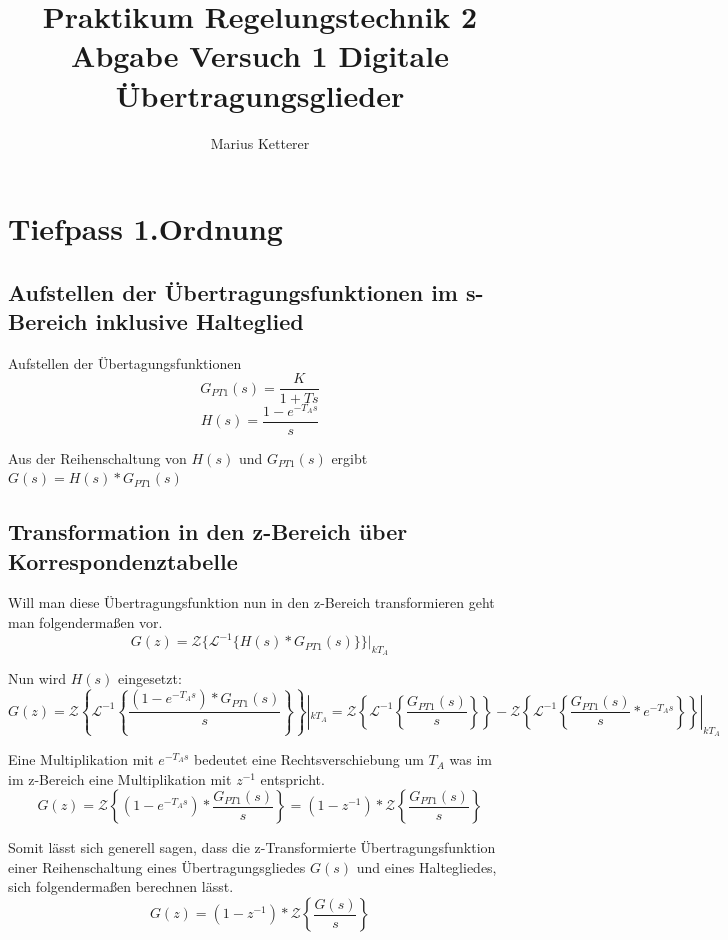 \documentclass[12pt,a4paper]{report}
\author{Marius Ketterer}
\title{Praktikum Regelungstechnik 2 Abgabe Versuch 1 Digitale Übertragungsglieder}
\begin{document}
\maketitle
\tableofcontents

\chapter{Tiefpass 1.Ordnung}
\section{Aufstellen der Übertragungsfunktionen im s-Bereich inklusive Halteglied}
Aufstellen der Übertagungsfunktionen
\begin{equation}
G_{PT1}(s) = \frac{K}{1+Ts} 
\end{equation}
\begin{equation}
H(s) = \frac{1-e^{-T_As}}{s}
\end{equation}

Aus der Reihenschaltung von $H(s)$ und $G_{PT1}(s)$ ergibt $G(s) = H(s)*G_{PT1}(s)$\\
\section{Transformation in den z-Bereich über Korrespondenztabelle}
Will man diese Übertragungsfunktion nun in den z-Bereich transformieren geht man folgendermaßen vor.
\begin{equation}
G(z) = \mathcal{Z}\{\mathcal{L}^{-1}\{H(s)*G_{PT1}(s)\}\}|_{kT_A}
\end{equation}

Nun wird $H(s)$ eingesetzt:
\begin{equation}
G(z)=
\mathcal{Z}\left\{\mathcal{L}^{-1}\left\{\frac{(1-e^{-T_As})* G_{PT1}(s)}{s}\right\}\right\}|_{kT_A}
= \mathcal{Z}\left\{\mathcal{L}^{-1}\left\{\frac{G_{PT1}(s)}{s}\right\}\right\}
-\mathcal{Z}\left\{\mathcal{L}^{-1}\left\{\frac{G_{PT1}(s)}{s}*e^{-T_As}\right\}\right\}|_{kT_A}
\end{equation}

Eine Multiplikation mit $e^{-T_As}$ bedeutet eine Rechtsverschiebung um $T_A$ was im im z-Bereich eine Multiplikation mit $z^{-1}$ entspricht.
\begin{equation}
G(z) = \mathcal{Z}\left\{(1-e^{-T_As})*\frac{G_{PT1}(s)}{s}\right\} = (1-z^{-1})*\mathcal{Z}\left\{\frac{G_{PT1}(s)}{s}\right\}
\end{equation}

Somit lässt sich generell sagen, dass die z-Transformierte Übertragungsfunktion einer Reihenschaltung eines Übertragungsgliedes $G(s)$ und eines Haltegliedes, sich folgendermaßen berechnen lässt.
\begin{equation}
G(z) = (1-z^{-1})*\mathcal{Z}\left\{\frac{G(s)}{s}\right\}
\label{generell}
\end{equation}
\end{document}
